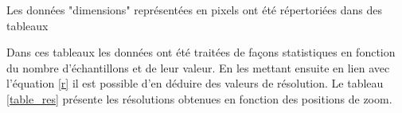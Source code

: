 \documentclass[11pt,letterpaper]{article}
\begin{document}
Les données "dimensions" représentées en pixels ont été répertoriées dans des tableaux

\begin{table}[h!]
\centering
{}
\caption{Tableau du nombre de pixels en fonction des tiges de référence pour le zoom minimum.}
\label{tige_min}
\end{table}

\begin{table}[h!]
\centering
{}
\caption{Tableau du nombre de pixels en fonction des tiges de référence pour le zoom maximum.}
\label{tige_max}


\end{table}

Dans ces tableaux les données ont été traitées de façons statistiques en fonction du nombre d'échantillons et de leur valeur. En les mettant ensuite en lien avec l'équation \ref{r} il est possible d'en déduire des valeurs de résolution. Le tableau \ref{table_res} présente les résolutions obtenues en fonction des positions de zoom. 
\end{document}

